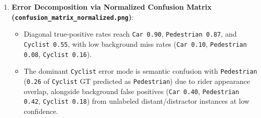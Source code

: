\documentclass[10.5pt,a4paper]{article}
\begin{document}
\begin{enumerate}[leftmargin=1.8em,itemsep=2pt]
\item \textbf{Error Decomposition via Normalized Confusion Matrix (\texttt{confusion\_\allowbreak{}matrix\_\allowbreak{}normalized.\allowbreak{}png})}:
\begin{itemize}[leftmargin=1.5em,itemsep=2pt]
\item Diagonal true-positive rates reach \texttt{Car 0.\allowbreak{}90}, \texttt{Pedestrian 0.\allowbreak{}87}, and \texttt{Cyclist 0.\allowbreak{}55}, with low background miss rates (\texttt{Car 0.\allowbreak{}10}, \texttt{Pedestrian 0.\allowbreak{}08}, \texttt{Cyclist 0.\allowbreak{}16}).
\item The dominant \texttt{Cyclist} error mode is semantic confusion with \texttt{Pedestrian} (\texttt{0.\allowbreak{}26} of \texttt{Cyclist} GT predicted as \texttt{Pedestrian}) due to rider appearance overlap, alongside background false positives (\texttt{Car 0.\allowbreak{}40}, \texttt{Pedestrian 0.\allowbreak{}42}, \texttt{Cyclist 0.\allowbreak{}18}) from unlabeled distant/distractor instances at low confidence.
\end{itemize}
\end{enumerate}
\end{document}
